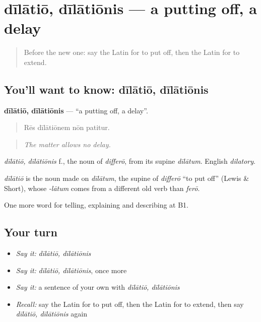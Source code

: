 \section[dīlātiō, dīlātiōnis]{dīlātiō, dīlātiōnis — a putting off, a delay}

\label{lesson:LA-C395-dilatio}



\begin{quote}
Before the new one: say the Latin for to put off, then the Latin for to extend.
\end{quote}

\subsection*{You'll want to know: dīlātiō, dīlātiōnis}
\textbf{dīlātiō, dīlātiōnis} — \textquotedblleft{}a putting off, a delay\textquotedblright{}.

\begin{quote}
Rēs dīlātiōnem nōn patitur.
\end{quote}

\begin{quote}
\emph{The matter allows no delay.}
\end{quote}

\emph{dīlātiō, dīlātiōnis} f., the noun of \emph{differō}, from its supine \emph{dīlātum}. English \emph{dilatory}.

\begin{cousinweb}
\emph{dīlātiō} is the noun made on \emph{dīlātum}, the supine of \emph{differō} \textquotedblleft{}to put off\textquotedblright{} (Lewis \& Short), whose \emph{-lātum} comes from a different old verb than \emph{ferō}.
\end{cousinweb}

\begin{grammarlens}[title={What you've built}]
One more word for telling, explaining and describing at B1.
\end{grammarlens}

\subsection*{Your turn}
\begin{itemize}
\raggedright
  \item \emph{Say it:} \emph{dīlātiō, dīlātiōnis}
  \item \emph{Say it:} \emph{dīlātiō, dīlātiōnis}, once more
  \item \emph{Say it:} a sentence of your own with \emph{dīlātiō, dīlātiōnis}
  \item \emph{Recall:} say the Latin for to put off, then the Latin for to extend, then say \emph{dīlātiō, dīlātiōnis} again
\end{itemize}

